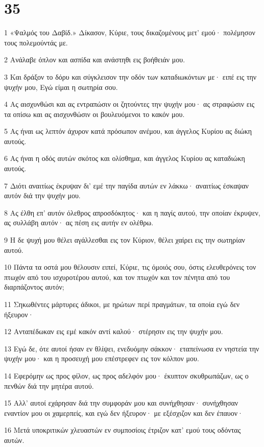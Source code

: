 \chapter{35}

\par 1 «Ψαλμός του Δαβίδ.» Δίκασον, Κύριε, τους δικαζομένους μετ' εμού· πολέμησον τους πολεμούντάς με.
\par 2 Ανάλαβε όπλον και ασπίδα και ανάστηθι εις βοήθειάν μου.
\par 3 Και δράξον το δόρυ και σύγκλεισον την οδόν των καταδιωκόντων με· ειπέ εις την ψυχήν μου, Εγώ είμαι η σωτηρία σου.
\par 4 Ας αισχυνθώσι και ας εντραπώσιν οι ζητούντες την ψυχήν μου· ας στραφώσιν εις τα οπίσω και ας αισχυνθώσιν οι βουλευόμενοι το κακόν μου.
\par 5 Ας ήναι ως λεπτόν άχυρον κατά πρόσωπον ανέμου, και άγγελος Κυρίου ας διώκη αυτούς.
\par 6 Ας ήναι η οδός αυτών σκότος και ολίσθημα, και άγγελος Κυρίου ας καταδιώκη αυτούς.
\par 7 Διότι αναιτίως έκρυψαν δι' εμέ την παγίδα αυτών εν λάκκω· αναιτίως έσκαψαν αυτόν διά την ψυχήν μου.
\par 8 Ας έλθη επ' αυτόν όλεθρος απροσδόκητος· και η παγίς αυτού, την οποίαν έκρυψεν, ας συλλάβη αυτόν· ας πέση εις αυτήν εν ολέθρω.
\par 9 Η δε ψυχή μου θέλει αγάλλεσθαι εις τον Κύριον, θέλει χαίρει εις την σωτηρίαν αυτού.
\par 10 Πάντα τα οστά μου θέλουσιν ειπεί, Κύριε, τις όμοιός σου, όστις ελευθερόνεις τον πτωχόν από του ισχυροτέρου αυτού, και τον πτωχόν και τον πένητα από του διαρπάζοντος αυτόν;
\par 11 Σηκωθέντες μάρτυρες άδικοι, με ηρώτων περί πραγμάτων, τα οποία εγώ δεν ήξευρον·
\par 12 Ανταπέδωκαν εις εμέ κακόν αντί καλού· στέρησιν εις την ψυχήν μου.
\par 13 Εγώ δε, ότε αυτοί ήσαν εν θλίψει, ενεδυόμην σάκκον· εταπείνωσα εν νηστεία την ψυχήν μου· και η προσευχή μου επέστρεφεν εις τον κόλπον μου.
\par 14 Εφερόμην ως προς φίλον, ως προς αδελφόν μου· έκυπτον σκυθρωπάζων, ως ο πενθών διά την μητέρα αυτού.
\par 15 Αλλ' αυτοί εχάρησαν διά την συμφοράν μου και συνήχθησαν· συνήχθησαν εναντίον μου οι χαμερπείς, και εγώ δεν ήξευρον· με εξέσχιζον και δεν έπαυον·
\par 16 Μετά υποκριτικών χλευαστών εν συμποσίοις έτριζον κατ' εμού τους οδόντας αυτών.
